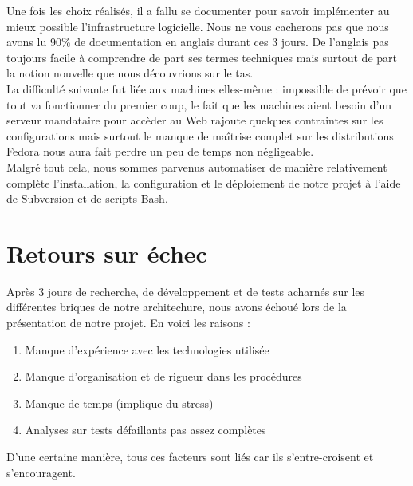 \documentclass[11pt,a4paper]{report}
\begin{document}
            Une fois les choix réalisés, il a fallu se documenter pour savoir implémenter au mieux possible l'infrastructure logicielle. Nous ne vous cacherons pas que nous avons lu 90\% de documentation en anglais durant ces 3 jours. De l'anglais pas toujours facile à comprendre de part ses termes techniques mais surtout de part la notion nouvelle que nous découvrions sur le tas.\\
            
            La difficulté suivante fut liée aux machines elles-même : impossible de prévoir que tout va fonctionner du premier coup, le fait que les machines aient besoin d'un serveur mandataire pour accèder au Web rajoute quelques contraintes sur les configurations mais surtout le manque de maîtrise complet sur les distributions Fedora nous aura fait perdre un peu de temps non négligeable.\\
            
            Malgré tout cela, nous sommes parvenus automatiser de manière relativement complète l'installation, la configuration et le déploiement de notre projet à l'aide de Subversion et de scripts Bash.
        
        \section{Retours sur échec}
        
            Après 3 jours de recherche, de développement et de tests acharnés sur les différentes briques de notre architechure, nous avons échoué lors de la présentation de notre projet. En voici les raisons :\\
            
            \begin{enumerate}
                \item Manque d'expérience avec les technologies utilisée
                \item Manque d'organisation et de rigueur dans les procédures
                \item Manque de temps (implique du stress)
                \item Analyses sur tests défaillants pas assez complètes
            \end{enumerate}
            
            D'une certaine manière, tous ces facteurs sont liés car ils s'entre-croisent et s'encouragent.\\
            
\end{document}

